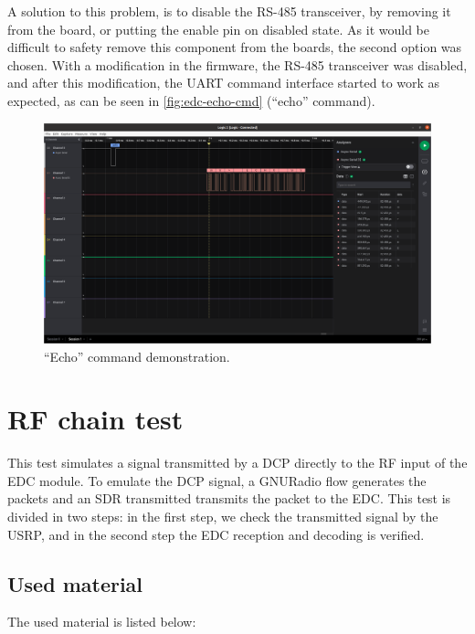 A solution to this problem, is to disable the RS-485 transceiver, by removing it from the board, or putting the enable pin on disabled state. As it would be difficult to safety remove this component from the boards, the second option was chosen. With a modification in the firmware, the RS-485 transceiver was disabled, and after this modification, the UART command interface started to work as expected, as can be seen in \autoref{fig:edc-echo-cmd} (``echo'' command).

\begin{figure}[!ht]
    \begin{center}
        \includegraphics[width=\textwidth]{figures/edc_report/echo-cmd}
        \caption{``Echo'' command demonstration.}
        \label{fig:edc-echo-cmd}
    \end{center}
\end{figure}

\section{RF chain test}

This test simulates a signal transmitted by a DCP directly to the RF input of the EDC module. To emulate the DCP signal, a GNURadio flow generates the packets and an SDR transmitted transmits the packet to the EDC. This test is divided in two steps: in the first step, we check the transmitted signal by the USRP, and in the second step the EDC reception and decoding is verified.

\subsection{Used material}

The used material is listed below:

